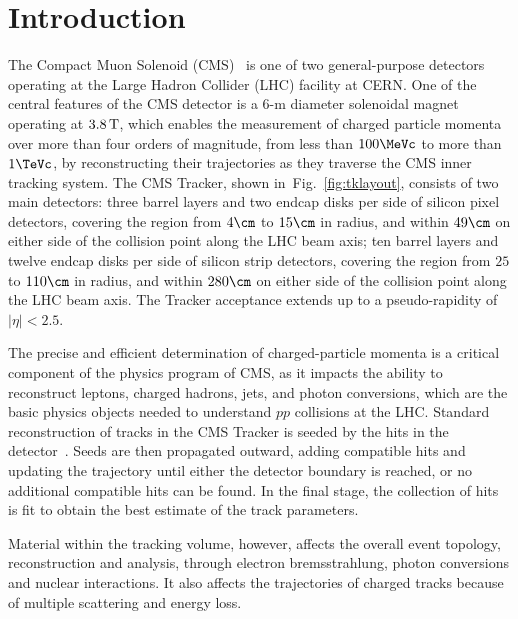 \section{Introduction}
\label{introductions}

The Compact Muon Solenoid (CMS)~\cite{JINST} is one of two general-purpose
detectors operating at the Large Hadron Collider (LHC) facility at CERN.
One of the central features of the CMS detector is a $6$-m diameter solenoidal
magnet operating at $3.8\,{\rm T}$, which enables the measurement of charged
particle momenta over more than four orders of magnitude, from less than
$100\MeVc$ to more than $1\TeVc$, by reconstructing their trajectories as they
traverse the CMS inner tracking system. The CMS Tracker, shown
in~Fig.~\ref{fig:tklayout}, consists of two main detectors: three
barrel layers and two endcap disks per side of silicon pixel detectors, covering
the region from $4\cm$ to $15\cm$ in radius, and within $49\cm$ on either
side of the collision point along the LHC beam axis; ten barrel layers and
twelve endcap disks per side of silicon strip detectors, covering the
region from $25$ to $110\cm$ in radius, and within $280\cm$ on either
side of the collision point along the LHC beam axis. The Tracker
acceptance extends up to a pseudo-rapidity of $\left | \eta \right | < 2.5$.


The precise and efficient determination of charged-particle momenta is a
critical component of the physics program of CMS, as it impacts the ability to
reconstruct leptons, charged hadrons, jets, and photon conversions, which
are the basic physics objects needed to understand $pp$ collisions at the LHC.
Standard reconstruction of tracks in
the CMS Tracker is seeded by the hits in the
detector~\cite{TRK-10-001}.  Seeds are then
propagated outward, adding compatible hits and updating the trajectory
until either the detector boundary is reached, or no additional
compatible hits can be found.  In the final stage, the collection of
hits is fit to obtain the best estimate of the track parameters.

Material within the tracking volume, however, affects the overall
event topology, reconstruction and analysis, through electron
bremsstrahlung, photon conversions and nuclear interactions. It also
affects the trajectories of charged tracks because of multiple
scattering and energy loss.

